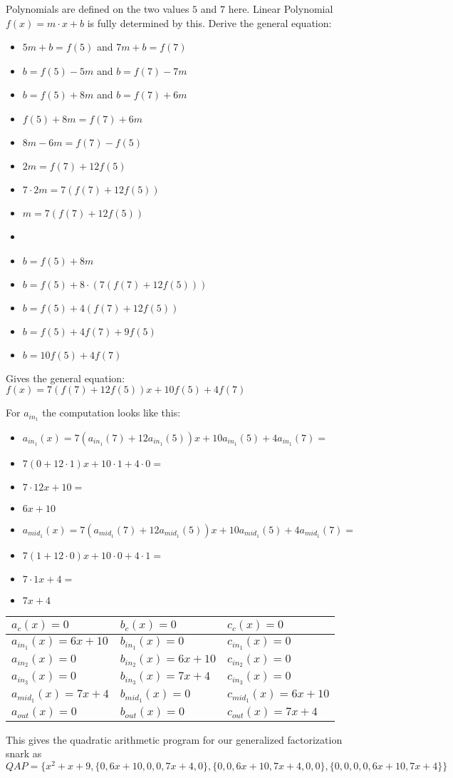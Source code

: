 \begin{example}
Polynomials are defined on the two values $5$ and $7$ here.
Linear Polynomial $f(x)=m\cdot x + b$ is fully determined by this. Derive the general equation:
\begin{itemize}                        
\item  $5m+b=f(5)$  and $7m+b=f(7)$  
\item  $b=f(5)-5m$ and  $b=f(7)-7m$   
\item  $b=f(5)+8m$ and  $b=f(7)+6m$  
\item  $f(5)+8m=f(7)+6m$              
\item  $8m-6m=f(7)-f(5)$               
\item  $2m=f(7)+ 12f(5)$              
\item  $7\cdot 2m=7(f(7)+12f(5))$              
\item  $m=7(f(7)+12f(5))$ 
\item             
\item  $b=f(5)+8m$                   
\item  $b=f(5)+8\cdot(7(f(7)+12f(5)))$
\item  $b=f(5)+4(f(7)+12f(5))$ 
\item  $b=f(5)+4f(7)+9f(5)$ 
\item  $b= 10f(5)+4f(7)$ 
\end{itemize}
Gives the general equation: $f(x)=7(f(7)+12f(5))x+10f(5)+4f(7)$

For $a_{in_1}$ the computation looks like this:
\begin{itemize}
\item $ a_{in_{1}}(x) = 7(a_{in_{1}}(7)+12a_{in_{1}}(5))x+ 
10a_{in_{1}}(5)+4a_{in_{1}}(7)=$
\item $7(0 + 12\cdot 1)x+ 
10\cdot 1 +4\cdot 0 =$
\item $7\cdot 12 x + 10=$
\item $6x+10$
\end{itemize}
\begin{itemize}
\item $ a_{mid_{1}}(x) = 7(a_{mid_{1}}(7)+12a_{mid_{1}}(5))x+ 
10a_{mid_{1}}(5)+4a_{mid_{1}}(7)=$
\item $7(1 + 12\cdot 0)x+ 10\cdot 0 +4\cdot 1=$
\item $7\cdot 1x +4=$
\item $7x+4 $
\end{itemize}


\begin{tabular}{|l|l|l|}\hline 
$a_{c}(x)=0 $ &$ b_{c}(x)=0   $ & $c_{c}(x)=0$ \tabularnewline\hline 
$a_{in_{1}}(x)=6x+10 $ &$ b_{in_{1}}(x)=0   $ & $c_{in_1}(x)=0$ \tabularnewline\hline 
$a_{in_{2}}(x)=0    $ &$ b_{in_{2}}(x)=6x+10$ & $c_{in_2}(x)=0$ \tabularnewline\hline 
$a_{in_{3}}(x)=0    $ &$ b_{in_{3}}(x)=7x+4$ & $c_{in_{3}}(x)=0$ \tabularnewline\hline 
$a_{mid_{1}}(x)=7x+4$ &$ b_{mid_{1}}(x)=0  $ & $c_{mid_{1}}(x)=6x+10$ \tabularnewline\hline 
$a_{out}(x)=0       $ &$ b_{out}(x)=0      $ & $c_{out}(x)=7x+4$ \tabularnewline\hline 
\end{tabular}
This gives the quadratic arithmetic program for our generalized factorization snark as
$$QAP=\{x^{2}+x+9,\{0,6x+10,0,0,7x+4,0\},\{0,0,6x+10,7x+4,0,0\},\{0,0,0,0,6x+10,7x+4\}\}$$


\end{example}
